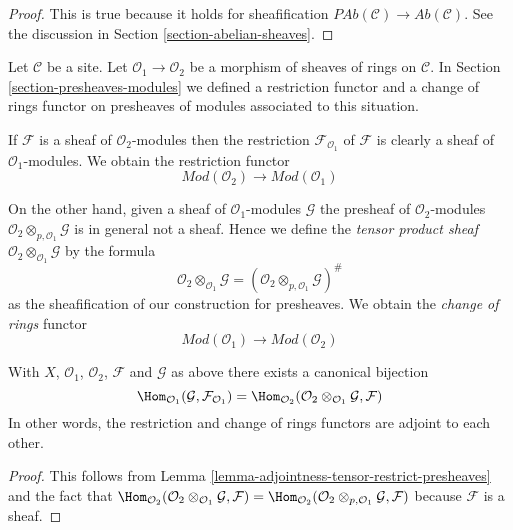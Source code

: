 \begin{proof}
This is true because it holds for sheafification
$\textit{PAb}(\mathcal{C}) \to \textit{Ab}(\mathcal{C})$.
See the discussion in Section \ref{section-abelian-sheaves}.
\end{proof}

\noindent
Let $\mathcal{C}$ be a site.
Let $\mathcal{O}_1 \to \mathcal{O}_2$ be
a morphism of sheaves of rings on $\mathcal{C}$.
In Section \ref{section-presheaves-modules}
we defined a restriction functor
and a change of rings functor on presheaves of modules
associated to this situation.

\medskip\noindent
If $\mathcal{F}$ is a sheaf of $\mathcal{O}_2$-modules
then the restriction $\mathcal{F}_{\mathcal{O}_1}$
of $\mathcal{F}$ is clearly a sheaf
of $\mathcal{O}_1$-modules. We obtain the restriction functor
$$
\textit{Mod}(\mathcal{O}_2)
\longrightarrow
\textit{Mod}(\mathcal{O}_1)
$$

\medskip\noindent
On the other hand, given a sheaf of $\mathcal{O}_1$-modules
$\mathcal{G}$ the presheaf of $\mathcal{O}_2$-modules
$\mathcal{O}_2 \otimes_{p, \mathcal{O}_1} \mathcal{G}$
is in general not a sheaf. Hence we define the
{\it tensor product sheaf}
$\mathcal{O}_2 \otimes_{\mathcal{O}_1} \mathcal{G}$
by the formula
$$
\mathcal{O}_2 \otimes_{\mathcal{O}_1} \mathcal{G}
=
(\mathcal{O}_2 \otimes_{p, \mathcal{O}_1} \mathcal{G})^\#
$$
as the sheafification of our construction for presheaves.
We obtain the {\it change of rings} functor
$$
\textit{Mod}(\mathcal{O}_1)
\longrightarrow
\textit{Mod}(\mathcal{O}_2)
$$

\begin{lemma}
\label{lemma-adjointness-tensor-restrict}
With $X$, $\mathcal{O}_1$, $\mathcal{O}_2$, $\mathcal{F}$ and
$\mathcal{G}$ as above there exists a canonical bijection
$$
\Hom_{\mathcal{O}_1}(\mathcal{G}, \mathcal{F}_{\mathcal{O}_1})
=
\Hom_{\mathcal{O}_2}(
\mathcal{O}_2 \otimes_{\mathcal{O}_1} \mathcal{G},
\mathcal{F}
)
$$
In other words, the restriction and change of rings functors
are adjoint to each other.
\end{lemma}

\begin{proof}
This follows from
Lemma \ref{lemma-adjointness-tensor-restrict-presheaves}
and the fact that
$\Hom_{\mathcal{O}_2}(
\mathcal{O}_2 \otimes_{\mathcal{O}_1} \mathcal{G},
\mathcal{F}
)
=
\Hom_{\mathcal{O}_2}(
\mathcal{O}_2 \otimes_{p, \mathcal{O}_1} \mathcal{G},
\mathcal{F}
)$
because $\mathcal{F}$ is a sheaf.
\end{proof}

